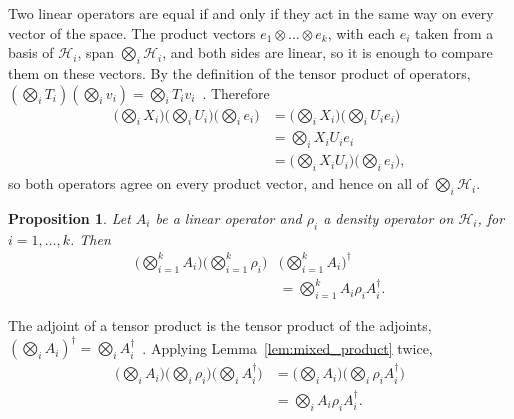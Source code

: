 \documentclass{ieeeaccess}
\newtheorem{proposition}{Proposition}[section]
\begin{document}
\begin{IEEEproof}
  Two linear operators are equal if and only if they act in the same way on every vector of the space. The product vectors $e_1 \otimes \dots \otimes e_k$, with each $e_i$ taken from a basis of $\mathcal{H}_i$, span $\bigotimes_{i} \mathcal{H}_i$, and both sides are linear, so it is enough to compare them on these vectors. By the definition of the tensor product of operators, $(\bigotimes_i T_i)(\bigotimes_i v_i) = \bigotimes_i T_i v_i$~\cite[Eq.~(1.8)]{zwiebach2013tensor}.
  Therefore
  \begin{align*}
    \Big(\bigotimes_{i} X_i\Big)\Big(\bigotimes_{i} U_i\Big)\Big(\bigotimes_{i} e_i\Big)
      &= \Big(\bigotimes_{i} X_i\Big)\Big(\bigotimes_{i} U_i e_i\Big) \\
      &= \bigotimes_{i} X_i U_i e_i \\
      &= \Big(\bigotimes_{i} X_i U_i\Big)\Big(\bigotimes_{i} e_i\Big),
  \end{align*}
  so both operators agree on every product vector, and hence on all of $\bigotimes_i \mathcal{H}_i$.
\end{IEEEproof}

\begin{proposition}
  Let $A_i$ be a linear operator and $\rho_i$ a density operator on $\mathcal{H}_i$, for $i = 1, \dots, k$. Then
  \begin{align*}
    \Big(\bigotimes_{i=1}^{k} A_i\Big)\Big(\bigotimes_{i=1}^{k} \rho_i\Big)&\Big(\bigotimes_{i=1}^{k} A_i\Big)^{\dagger} \\
      &= \bigotimes_{i=1}^{k} A_i \rho_i A_i^{\dagger}.
  \end{align*}
  \label{prop:product_operation}
\end{proposition}

\begin{IEEEproof}
  The adjoint of a tensor product is the tensor product of the adjoints, $(\bigotimes_i A_i)^{\dagger} = \bigotimes_i A_i^{\dagger}$~\cite{Nielsen_Chuang_2010}. %
  Applying Lemma~\ref{lem:mixed_product} twice,
  \begin{align*}
    \Big(\bigotimes_{i} A_i\Big)\Big(\bigotimes_{i} \rho_i\Big)\Big(\bigotimes_{i} A_i^{\dagger}\Big)
      &= \Big(\bigotimes_{i} A_i\Big)\Big(\bigotimes_{i} \rho_i A_i^{\dagger}\Big) \\
      &= \bigotimes_{i} A_i \rho_i A_i^{\dagger}.
  \end{align*}
\end{IEEEproof}
\end{document}
